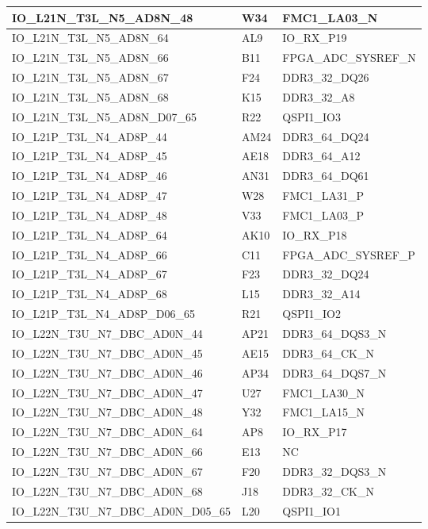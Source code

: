 \begin{footnotesize}
\begin{longtable}{|p{7cm}|p{1cm}|p{5cm}|}
IO\_L21N\_T3L\_N5\_AD8N\_48	&	W34	&	FMC1\_LA03\_N	\\ \hline
IO\_L21N\_T3L\_N5\_AD8N\_64	&	AL9	&	IO\_RX\_P19	\\ \hline
IO\_L21N\_T3L\_N5\_AD8N\_66	&	B11	&	FPGA\_ADC\_SYSREF\_N	\\ \hline
IO\_L21N\_T3L\_N5\_AD8N\_67	&	F24	&	DDR3\_32\_DQ26	\\ \hline
IO\_L21N\_T3L\_N5\_AD8N\_68	&	K15	&	DDR3\_32\_A8	\\ \hline
IO\_L21N\_T3L\_N5\_AD8N\_D07\_65	&	R22	&	QSPI1\_IO3	\\ \hline
IO\_L21P\_T3L\_N4\_AD8P\_44	&	AM24	&	DDR3\_64\_DQ24	\\ \hline
IO\_L21P\_T3L\_N4\_AD8P\_45	&	AE18	&	DDR3\_64\_A12	\\ \hline
IO\_L21P\_T3L\_N4\_AD8P\_46	&	AN31	&	DDR3\_64\_DQ61	\\ \hline
IO\_L21P\_T3L\_N4\_AD8P\_47	&	W28	&	FMC1\_LA31\_P	\\ \hline
IO\_L21P\_T3L\_N4\_AD8P\_48	&	V33	&	FMC1\_LA03\_P	\\ \hline
IO\_L21P\_T3L\_N4\_AD8P\_64	&	AK10	&	IO\_RX\_P18	\\ \hline
IO\_L21P\_T3L\_N4\_AD8P\_66	&	C11	&	FPGA\_ADC\_SYSREF\_P	\\ \hline
IO\_L21P\_T3L\_N4\_AD8P\_67	&	F23	&	DDR3\_32\_DQ24	\\ \hline
IO\_L21P\_T3L\_N4\_AD8P\_68	&	L15	&	DDR3\_32\_A14	\\ \hline
IO\_L21P\_T3L\_N4\_AD8P\_D06\_65	&	R21	&	QSPI1\_IO2	\\ \hline
IO\_L22N\_T3U\_N7\_DBC\_AD0N\_44	&	AP21	&	DDR3\_64\_DQS3\_N	\\ \hline
IO\_L22N\_T3U\_N7\_DBC\_AD0N\_45	&	AE15	&	DDR3\_64\_CK\_N	\\ \hline
IO\_L22N\_T3U\_N7\_DBC\_AD0N\_46	&	AP34	&	DDR3\_64\_DQS7\_N	\\ \hline
IO\_L22N\_T3U\_N7\_DBC\_AD0N\_47	&	U27	&	FMC1\_LA30\_N	\\ \hline
IO\_L22N\_T3U\_N7\_DBC\_AD0N\_48	&	Y32	&	FMC1\_LA15\_N	\\ \hline
IO\_L22N\_T3U\_N7\_DBC\_AD0N\_64	&	AP8	&	IO\_RX\_P17	\\ \hline
IO\_L22N\_T3U\_N7\_DBC\_AD0N\_66	&	E13	&	NC	\\ \hline
IO\_L22N\_T3U\_N7\_DBC\_AD0N\_67	&	F20	&	DDR3\_32\_DQS3\_N	\\ \hline
IO\_L22N\_T3U\_N7\_DBC\_AD0N\_68	&	J18	&	DDR3\_32\_CK\_N	\\ \hline
IO\_L22N\_T3U\_N7\_DBC\_AD0N\_D05\_65	&	L20	&	QSPI1\_IO1	\\ \hline

\end{longtable}
\end{footnotesize}

